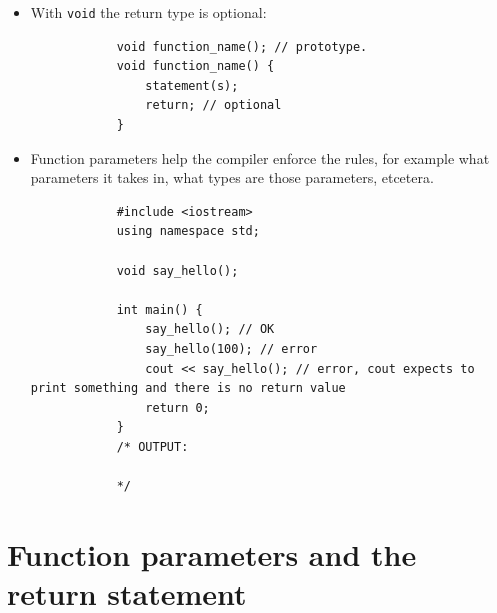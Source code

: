 \begin{itemize}
    \item With \texttt{void} the return type is optional:
        \begin{verbatim}
            void function_name(); // prototype.
            void function_name() {
                statement(s);
                return; // optional
            }
        \end{verbatim}
    
    \item Function parameters help the compiler enforce the rules, for example what parameters it takes in, what types are those parameters, etcetera.
        \begin{verbatim}
            #include <iostream>
            using namespace std;

            void say_hello();

            int main() {
                say_hello(); // OK
                say_hello(100); // error
                cout << say_hello(); // error, cout expects to print something and there is no return value
                return 0;
            }
            /* OUTPUT:

            */
        \end{verbatim}
\end{itemize}


\section{Function parameters and the return statement}
